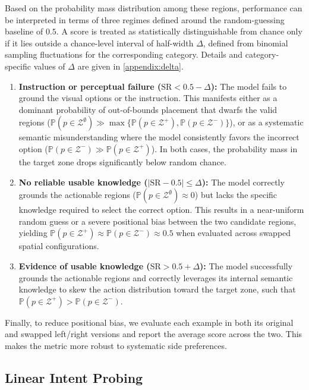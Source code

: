 \documentclass[11pt]{article}
\begin{document}
Based on the probability mass distribution among these regions, performance can be interpreted in terms of three regimes defined around the random-guessing baseline of $0.5$. A score is treated as statistically distinguishable from chance only if it lies outside a chance-level interval of half-width $\Delta$, defined from binomial sampling fluctuations for the corresponding category. Details and category-specific values of $\Delta$ are given in \autoref{appendix:delta}.
\begin{enumerate}
    \item \textbf{Instruction or perceptual failure ($\text{SR} < 0.5 - \Delta$):} The model fails to ground the visual options or the instruction. This manifests either as a dominant probability of out-of-bounds placement that dwarfs the valid regions ($\mathbb{P}(p \in \mathcal{Z}^{\emptyset}) \gg \max\{\mathbb{P}(p \in \mathcal{Z}^+), \mathbb{P}(p \in \mathcal{Z}^-)\}$), or as a systematic semantic misunderstanding where the model consistently favors the incorrect option ($\mathbb{P}(p \in \mathcal{Z}^-) \gg \mathbb{P}(p \in \mathcal{Z}^+)$). In both cases, the probability mass in the target zone drops significantly below random chance.
    \item \textbf{No reliable usable knowledge ($|\text{SR} - 0.5| \le \Delta$):} The model correctly grounds the actionable regions ($\mathbb{P}(p \in \mathcal{Z}^{\emptyset}) \approx 0$) but lacks the specific knowledge required to select the correct option. This results in a near-uniform random guess or a severe positional bias between the two candidate regions, yielding $\mathbb{P}(p \in \mathcal{Z}^+) \approx \mathbb{P}(p \in \mathcal{Z}^-) \approx 0.5$ when evaluated across swapped spatial configurations.
    \item \textbf{Evidence of usable knowledge ($\text{SR} > 0.5 + \Delta$):} The model successfully grounds the actionable regions and correctly leverages its internal semantic knowledge to skew the action distribution toward the target zone, such that $\mathbb{P}(p \in \mathcal{Z}^+) > \mathbb{P}(p \in \mathcal{Z}^-)$.
\end{enumerate}
Finally, to reduce positional bias, we evaluate each example in both its original and swapped left/right versions and report the average score across the two. This makes the metric more robust to systematic side preferences.

\subsection{Linear Intent Probing}
\end{document}
